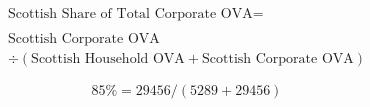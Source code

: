 \begin{enumerate}
\begin{equation}
\begin{split}
\text{Scottish Share of Total Corporate OVA} =  \\ \\
\text{Scottish Corporate OVA}\\ 
\div (\text{Scottish Household OVA}+ \text{Scottish Corporate OVA}) 
\end{split} \label{eq:2.5.84}
\end{equation}

\begin{equation} \nonumber
85\% = 29456/(5289+29456)
\end{equation}\\



\end{enumerate}

\pagebreak



